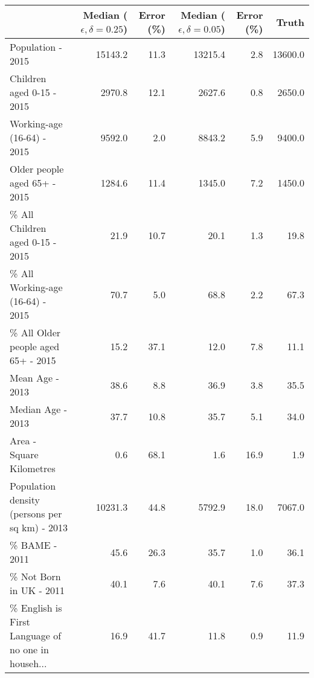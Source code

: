 \documentclass[conference]{IEEEtran}
\begin{document}
\begin{table*}[t]
\centering
\footnotesize
\begin{tabular}{lrrrrr}
\hline
{} &  Median ($\epsilon, \delta = 0.25$) &  Error (\%) &  Median ($\epsilon, \delta = 0.05$) &  Error (\%) &   Truth \\
\hline
Population - 2015                                  &        15143.2 &       11.3 &        13215.4 &        2.8 & 13600.0 \\
Children aged 0-15 - 2015                          &         2970.8 &       12.1 &         2627.6 &        0.8 &  2650.0 \\
Working-age (16-64) - 2015                         &         9592.0 &        2.0 &         8843.2 &        5.9 &  9400.0 \\
Older people aged 65+ - 2015                       &         1284.6 &       11.4 &         1345.0 &        7.2 &  1450.0 \\
\% All Children aged 0-15 - 2015                    &           21.9 &       10.7 &           20.1 &        1.3 &    19.8 \\
\% All Working-age (16-64) - 2015                   &           70.7 &        5.0 &           68.8 &        2.2 &    67.3 \\
\% All Older people aged 65+ - 2015                 &           15.2 &       37.1 &           12.0 &        7.8 &    11.1 \\
Mean Age - 2013                                    &           38.6 &        8.8 &           36.9 &        3.8 &    35.5 \\
Median Age - 2013                                  &           37.7 &       10.8 &           35.7 &        5.1 &    34.0 \\
Area - Square Kilometres                           &            0.6 &       68.1 &            1.6 &       16.9 &     1.9 \\
Population density (persons per sq km) - 2013      &        10231.3 &       44.8 &         5792.9 &       18.0 &  7067.0 \\
\% BAME - 2011                                      &           45.6 &       26.3 &           35.7 &        1.0 &    36.1 \\
\% Not Born in UK - 2011                            &           40.1 &        7.6 &           40.1 &        7.6 &    37.3 \\
\% English is First Language of no one in househ... &           16.9 &       41.7 &           11.8 &        0.9 &    11.9 \\

\end{tabular}
\end{table*}
\end{document}
